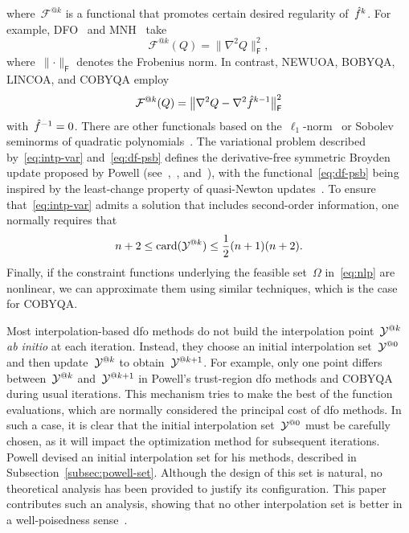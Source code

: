 \documentclass{article}
\makeatletter
\newcounter{cite}
\numberwithin{equation}{section}
\theoremstyle{definition}
\theoremstyle{plain}
\theoremstyle{remark}
\DeclareMathOperator{\card}{card}
\newcommand*{\norm}[2][]{#1\lVert#2#1\rVert}
\newcommand*{\obj}{f}
\newcommand*{\objm}[1][]{\hat{\obj}\ifblank{#1}{}{^{#1}}}
\newcommand*{\fset}{\Omega}
\newcommand*{\xpt}[1][]{\mathcal{Y}\ifblank{#1}{}{^{@#1}}}
\newcommand{\reviewed}[1]{\texorpdfstring{{\color{NavyBlue}#1}}{#1}}
\makeatother
\begin{document}
where~$\mathcal{F}^{@k}$ is a functional that promotes certain desired regularity of~$\objm[k]$.
For example, DFO~\cite{Conn_Scheinberg_Toint_1998} and MNH~\cite{Wild_2008} take
\begin{equation}
    \label{eq:mnh}
    \mathcal{F}^{@k}(Q) = \norm[\big]{\nabla^2 Q}_{\mathsf{F}}^2,
\end{equation}
where~$\norm{\cdot}_{\mathsf{F}}$ denotes the Frobenius norm.
In contrast, NEWUOA, BOBYQA, LINCOA, and COBYQA employ
\begin{equation}
    \label{eq:df-psb}
    \mathcal{F}^{@k}(Q) = \norm[\big]{\nabla^2 Q - \nabla^2 \objm[k - 1]}_{\mathsf{F}}^2
\end{equation}
with~$\objm[-1] = 0$.
There are other functionals based on the~$\ell_1$-norm~\cite{Bandeira_Scheinberg_Vicente_2012} or Sobolev seminorms of quadratic polynomials~\cite{Zhang_2014,Xie_Yuan_2022}.
The variational problem \reviewed{described by~\eqref{eq:intp-var} and~\eqref{eq:df-psb}} defines the derivative-free symmetric
Broyden update proposed by Powell (see~\cite{Powell_2004a,Powell_2013},~\cite[\S~3.6]{Zhang_2012}, and~\cite[\S~2.4.2]{Ragonneau_2022}), with the functional~\eqref{eq:df-psb} being inspired by the least-change property of quasi-Newton updates~\cite{Dennis_Schnabel_1979}.
To ensure that~\eqref{eq:intp-var} admits a solution that includes second-order information, one normally requires that
\begin{equation*}
    n + 2 \le \card(\xpt[k]) \le \frac{1}{2} (n + 1) (n + 2).
\end{equation*}
Finally, if the constraint functions underlying the feasible set~$\fset$ in~\eqref{eq:nlp} are nonlinear, we can approximate them using similar techniques, which is the case for COBYQA.

Most interpolation-based \gls{dfo} methods do not build the interpolation point~$\xpt[k]$ \emph{ab initio} at each iteration.
Instead, they choose an initial interpolation set~$\xpt[0]$ and then  update~$\xpt[k]$ to obtain~$\xpt[k + 1]$.
For example, only one point differs between~$\xpt[k]$ and~$\xpt[k + 1]$ in Powell's trust-region \gls{dfo} methods and COBYQA during usual iterations.
This mechanism tries to make the best of the function evaluations, which are normally considered the principal cost of \gls{dfo} methods.
In such a case, it is clear that the initial interpolation set~$\xpt[0]$ must be carefully chosen, as it will impact the optimization method for subsequent iterations.
Powell devised an initial interpolation set for his methods, described in Subsection~\ref{subsec:powell-set}.
Although the design of this set is natural, no theoretical analysis has been provided to justify its configuration.
This paper contributes such an analysis, showing that no other interpolation set is better in a well-poisedness sense\reviewed{~\cite[\S~3.3]{Conn_Scheinberg_Vicente_2009}}.
\end{document}
